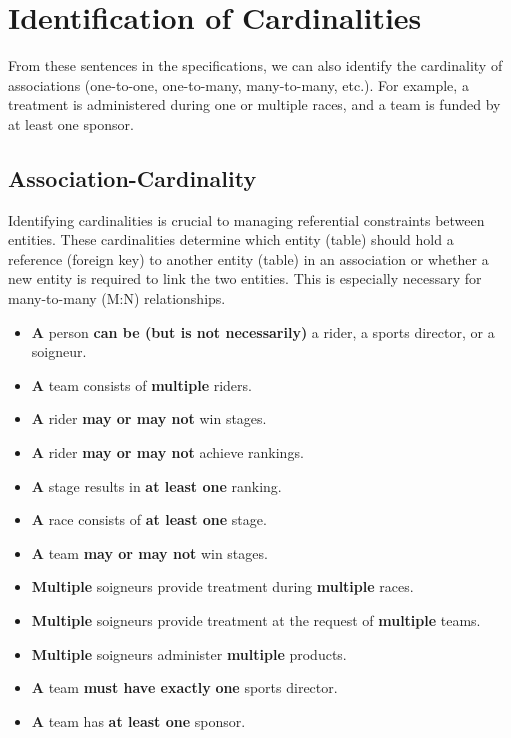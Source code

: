 \section{Identification of Cardinalities}

From these sentences in the specifications, we can also identify the cardinality of associations (one-to-one, one-to-many, many-to-many, etc.). For example, a treatment is administered during one or multiple races, and a team is funded by at least one sponsor.

\subsection{Association-Cardinality}
Identifying cardinalities is crucial to managing referential constraints between entities. These cardinalities determine which entity (table) should hold a reference (foreign key) to another entity (table) in an association or whether a new entity is required to link the two entities. This is especially necessary for many-to-many (M:N) relationships.

\begin{itemize}
\item \textbf{A} person \textbf{can be (but is not necessarily)} a rider, a sports director, or a soigneur.
\item \textbf{A} team consists of \textbf{multiple} riders.
\item \textbf{A} rider \textbf{may or may not} win stages.
\item \textbf{A} rider \textbf{may or may not} achieve rankings.
\item \textbf{A} stage results in \textbf{at least one} ranking.
\item \textbf{A} race consists of \textbf{at least one} stage.
\item \textbf{A} team \textbf{may or may not} win stages.
\item \textbf{Multiple} soigneurs provide treatment during \textbf{multiple} races.
\item \textbf{Multiple} soigneurs provide treatment at the request of \textbf{multiple} teams.
\item \textbf{Multiple} soigneurs administer \textbf{multiple} products.
\item \textbf{A} team \textbf{must have exactly} \textbf{one} sports director.
\item \textbf{A} team has \textbf{at least one} sponsor.
\end{itemize}

